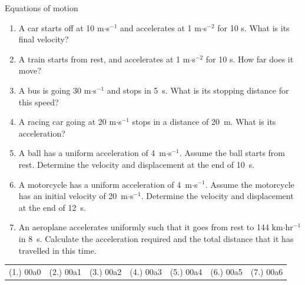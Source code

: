 \begin{exercises}{Equations of motion}
            \nopagebreak \noindent\vspace{-1cm}
          \label{m38796*id79517}\begin{enumerate}[noitemsep, label=\textbf{\arabic*}. ] 
\label{m38796*uid144}\item A car starts off at 10 m$\ensuremath{\cdot}$s${}^{-1}$ and accelerates at 1 m$\ensuremath{\cdot}$s${}^{-2}$ for 10 s. What is its final velocity?\newline
\label{m38796*uid145}\item A train starts from rest, and accelerates at 1 m$\ensuremath{\cdot}$s${}^{-2}$ for 10 s. How far does it move?\newline
\label{m38796*uid146}\item A bus is going 30 m$\ensuremath{\cdot}$s${}^{-1}$ and stops in 5~s. What is its stopping distance for this speed?\newline
\label{m38796*uid147}\item A racing car going at 20 m$\ensuremath{\cdot}$s${}^{-1}$ stops in a distance of 20~m. What is its acceleration?\newline
\label{m38796*uid148}\item A ball has a uniform acceleration of 4~m$\ensuremath{\cdot}$s${}^{-1}$. Assume the ball starts from rest. Determine the velocity and displacement at the end of 10~s.\newline
\label{m38796*uid149}\item A motorcycle has a uniform acceleration of 4~m$\ensuremath{\cdot}$s${}^{-1}$. Assume the motorcycle has an initial velocity of 20~m$\ensuremath{\cdot}$s${}^{-1}$. Determine the velocity and displacement at the end of 12~s.\newline
\label{m38796*uid150}\item An aeroplane accelerates uniformly such that it goes from rest to 144 km$\ensuremath{\cdot}$hr${}^{-1}$in 8~s. Calculate the acceleration required and the total distance that it has travelled in this time.\newline
\end{enumerate}
    \label{m38796*cid11}
\par \practiceinfo
 \par \begin{tabular}[h]{cccccc}
 (1.) 00a0  &  (2.) 00a1  &  (3.) 00a2  &  (4.) 00a3  &  (5.) 00a4  &  (6.) 00a5  & (7.) 00a6 \end{tabular}
\end{exercises}

